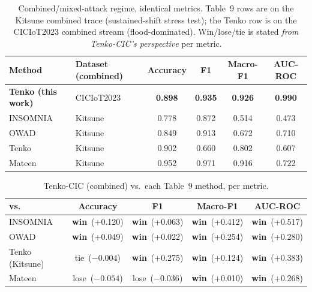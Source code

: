 \documentclass[10pt]{article}
\newcommand{\win}{\textcolor{green!55!black}{\textbf{win}}}
\newcommand{\lose}{\textcolor{red!75!black}{lose}}
\newcommand{\tie}{\textcolor{orange!85!black}{tie}}
\begin{document}
\begin{table}[h]
\centering
\caption{Combined/mixed-attack regime, identical metrics. Table~9 rows are on the Kitsune
combined trace (sustained-shift stress test); the Tenko row is on the CICIoT2023 combined
stream (flood-dominated). Win/lose/tie is stated \emph{from Tenko-CIC's perspective} per
metric.}
\label{tab:table9}
\begin{tabular}{ll cccc}
\toprule
\textbf{Method} & \textbf{Dataset (combined)} & \textbf{Accuracy} & \textbf{F1} & \textbf{Macro-F1} & \textbf{AUC-ROC} \\
\midrule
\textbf{Tenko (this work)} & CICIoT2023 & \textbf{0.898} & \textbf{0.935} & \textbf{0.926} & \textbf{0.990} \\
\midrule
INSOMNIA & Kitsune & 0.778 & 0.872 & 0.514 & 0.473 \\
OWAD     & Kitsune & 0.849 & 0.913 & 0.672 & 0.710 \\
Tenko    & Kitsune & 0.902 & 0.660 & 0.802 & 0.607 \\
Mateen   & Kitsune & 0.952 & 0.971 & 0.916 & 0.722 \\
\bottomrule
\end{tabular}
\end{table}

\begin{table}[h]
\centering
\caption{Tenko-CIC (combined) vs.\ each Table~9 method, per metric.}
\label{tab:winlose}
\begin{tabular}{l cccc}
\toprule
\textbf{vs.} & \textbf{Accuracy} & \textbf{F1} & \textbf{Macro-F1} & \textbf{AUC-ROC} \\
\midrule
INSOMNIA & \win\ (+0.120) & \win\ (+0.063) & \win\ (+0.412) & \win\ (+0.517) \\
OWAD     & \win\ (+0.049) & \win\ (+0.022) & \win\ (+0.254) & \win\ (+0.280) \\
Tenko (Kitsune) & \tie\ ($-0.004$) & \win\ (+0.275) & \win\ (+0.124) & \win\ (+0.383) \\
Mateen   & \lose\ ($-0.054$) & \lose\ ($-0.036$) & \win\ (+0.010) & \win\ (+0.268) \\
\bottomrule
\end{tabular}
\end{table}
\end{document}
